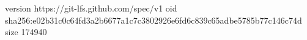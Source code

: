 version https://git-lfs.github.com/spec/v1
oid sha256:e02b31c0c64fd3a2b6677a1c7c3802926e6fd6c839c65adbe5785b77c146c74d
size 174940
